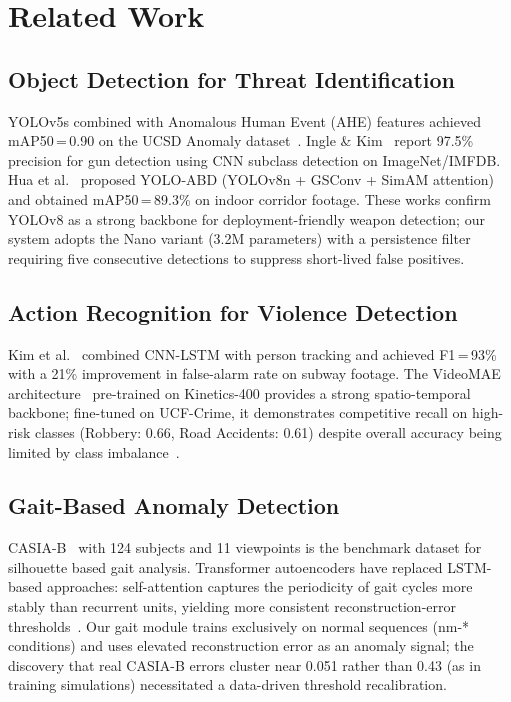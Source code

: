 \documentclass[conference]{IEEEtran}
\begin{document}
\section{Related Work}\label{sec:related}

\subsection{Object Detection for Threat Identification}
YOLOv5s combined with Anomalous Human Event (AHE) features achieved
mAP50\,=\,0.90 on the UCSD Anomaly dataset~\cite{shaik2025}.
Ingle \& Kim~\cite{ingle2022} report 97.5\% precision for gun detection
using CNN subclass detection on ImageNet/IMFDB.
Hua et al.~\cite{hua2024} proposed YOLO-ABD (YOLOv8n + GSConv + SimAM
attention) and obtained mAP50\,=\,89.3\% on indoor corridor footage.
These works confirm YOLOv8 as a strong backbone for deployment-friendly
weapon detection; our system adopts the Nano variant (3.2M parameters) with
a persistence filter requiring five consecutive detections to suppress
short-lived false positives.

\subsection{Action Recognition for Violence Detection}
Kim et al.~\cite{kim2024} combined CNN-LSTM with person tracking and
achieved F1\,=\,93\% with a 21\% improvement in false-alarm rate on subway
footage.
The VideoMAE architecture~\cite{tong2022} pre-trained on Kinetics-400
provides a strong spatio-temporal backbone; fine-tuned on UCF-Crime, it
demonstrates competitive recall on high-risk classes (Robbery: 0.66,
Road Accidents: 0.61) despite overall accuracy being limited by class
imbalance~\cite{ucfcrime}.

\subsection{Gait-Based Anomaly Detection}
CASIA-B~\cite{casiab} with 124 subjects and 11 viewpoints is the
benchmark dataset for silhouette based gait analysis.
Transformer autoencoders have replaced LSTM-based approaches: self-attention
captures the periodicity of gait cycles more stably than recurrent units,
yielding more consistent reconstruction-error thresholds~\cite{veesam2025}.
Our gait module trains exclusively on normal sequences (nm-* conditions) and
uses elevated reconstruction error as an anomaly signal; the discovery that
real CASIA-B errors cluster near 0.051 rather than 0.43 (as in training
simulations) necessitated a data-driven threshold recalibration.
\end{document}
